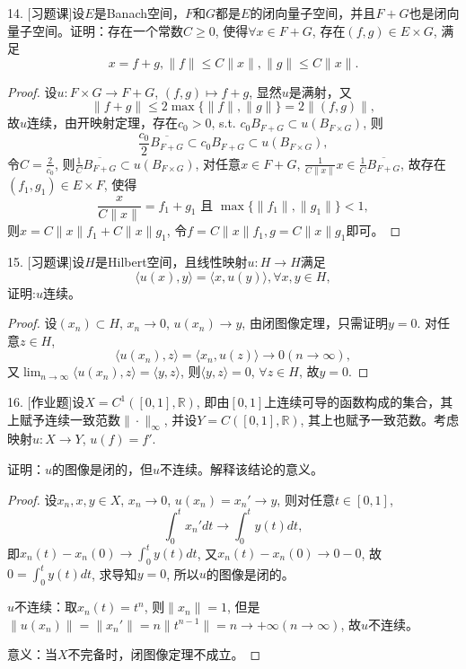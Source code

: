 \documentclass[a4paper,8pt]{ctexart}\textwidth 140mm \textheight 216mm
\newcommand{\8}{\infty}
\newcommand{\la}{\langle}
\newcommand{\ra}{\rangle}
\begin{document}
14. [习题课]设$E$是Banach空间，$F$和$G$都是$E$的闭向量子空间，并且$F+G$也是闭向量子空间。证明：存在一个常数$C\geq 0$, 使得$\forall x\in F+G$, 存在$(f,g)\in E\times G$, 满足
$$x=f+g,\|f\|\leq C\|x\|,\|g\|\leq C\|x\|.$$
\begin{proof}
	设$u:F\times G\to F+G$, $(f,g)\mapsto f+g$, 显然$u$是满射，又
	\begin{equation*}
	\|f+g\|\leq 2\max\{\|f\|,\|g\|\}=2\|(f,g)\|,
	\end{equation*}
	故$u$连续，由开映射定理，存在$c_0>0$, s.t. $c_0B_{F+G}\subset u(B_{F\times G})$, 则
	\begin{equation*}
	\frac{c_0}{2}\overline{B_{F+G}}\subset c_0B_{F+G}\subset u(B_{F\times G}),
	\end{equation*}
	令$C=\frac{2}{c_0}$, 则$\frac{1}{C}\overline{B_{F+G}}\subset u(B_{F\times G})$, 对任意$x\in F+G$, $\frac{1}{C\|x\|}x\in \frac{1}{C}\overline{B_{F+G}}$, 故存在$(f_1,g_1)\in E\times F$, 使得
	\begin{equation*}
	\frac{x}{C\|x\|}=f_1+g_1\mbox{ 且 }\max\{\|f_1\|,\|g_1\|\}<1,
	\end{equation*} 
	则$x=C\|x\|f_1+C\|x\|g_1$, 令$f=C\|x\|f_1, g=C\|x\|g_1$即可。
\end{proof}

15. [习题课]设$H$是Hilbert空间，且线性映射$u:H\to H$满足
\begin{equation*}
\la u(x),y\ra=\la x,u(y)\ra,\forall x,y\in H,
\end{equation*}
证明:$u$连续。
\begin{proof}
	设$(x_n)\subset H$, $x_n\to 0$, $u(x_n)\to y$, 由闭图像定理，只需证明$y=0$.
	对任意$z\in H$, 
	\begin{equation*}
	\la u(x_n),z\ra=\la x_n,u(z)\ra\to 0(n\to\infty),
	\end{equation*}
	又$\lim_{n\to\infty}\la u(x_n),z\ra=\la y,z\ra$, 则$\la y,z\ra=0$, $\forall z\in H$,
	故$y=0$.
\end{proof}

16. [作业题]设$X=C^1([0,1],\mathbb{R})$, 即由$[0,1]$上连续可导的函数构成的集合，其上赋予连续一致范数$\|\cdot\|_\infty$, 并设$Y=C([0,1],\mathbb{R})$, 其上也赋予一致范数。考虑映射$u:X\to Y$, $u(f)=f'$.

证明：$u$的图像是闭的，但$u$不连续。解释该结论的意义。
\begin{proof}
	设$x_n,x,y\in X$, $x_n\to 0$, $u(x_n)=x_n'\to y$, 则对任意$t\in[0,1]$, 
	$$\int_0^t x_n'dt\to\int_0^t y(t)dt,$$
	即$x_n(t)-x_n(0)\to\int_0^t y(t)dt$, 又$x_n(t)-x_n(0)\to 0-0$, 故$0=\int_0^t y(t)dt$, 求导知$y=0$, 所以$u$的图像是闭的。
	
	$u$不连续：取$x_n(t)=t^n$, 则$\|x_n\|=1$, 但是$\|u(x_n)\|=\|x_n'\|=n\|t^{n-1}\|=n\to+\infty(n\to\infty)$, 故$u$不连续。
	
	意义：当$X$不完备时，闭图像定理不成立。
\end{proof}
\end{document}
